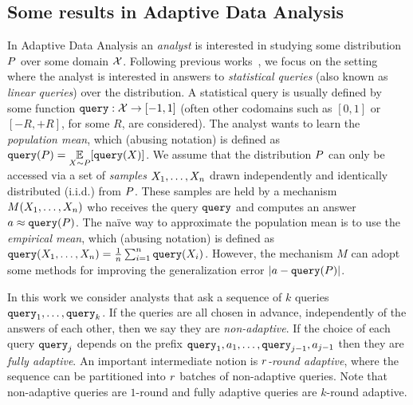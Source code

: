 \subsection{Some results in Adaptive Data Analysis}
In Adaptive Data Analysis an \emph{analyst} is interested in studying some distribution $P$ over some domain $\mathcal{X}$.  Following previous works~\cite{DworkFHPRR15,HardtU14,BassilyNSSSU16}, we focus on the setting where the analyst is interested in answers to \emph{statistical queries} (also known as \emph{linear queries}) over the distribution.  A statistical query is usually defined by some function ${\tt query} : \mathcal{X} \to [-1,1]$ (often other codomains such as $[0,1]$ or $[-R,+R]$, for some $R$, are considered).  The analyst wants to learn the \emph{population mean}, which (abusing notation) is defined as 
$\query(\dist) = \ex{\sample \sim \dist}{\query(\sample)}$. 
%
We assume that the distribution $P$ can only be accessed via a set of \emph{samples} $X_1,\dots,X_n$ drawn independently and identically distributed (i.i.d.) from $P$.  These samples are held by a mechanism $M(X_1,\dots,X_n)$ who receives the query ${\tt query}$ and computes an answer 
$a \approx {\tt query}(P)$.
%
The na\"ive way to approximate the population mean is to use the \emph{empirical mean}, which (abusing notation) is defined as 
${\tt query}(X_1,\dots,X_n) = \frac{1}{n} \sum_{i=1}^{n} {\tt query}(X_i)$.
However, the mechanism $M$ can adopt some methods for improving the generalization error $| a- {\tt query}(P)|$.

In this work we consider analysts that ask a sequence of $k$ queries ${\tt query}_1,\dots,{\tt query}_k$.  If the queries are all chosen in advance, independently of the answers of each other, then we say they are \emph{non-adaptive}.  If the choice of each query ${\tt query}_j$ depends on the prefix ${\tt query}_1,a_1,\dots,{\tt query}_{j-1},a_{j-1}$ then they are \emph{fully adaptive}.  An important intermediate notion is \emph{$r$-round adaptive}, where the sequence can be partitioned into $r$ batches of non-adaptive queries.  Note that non-adaptive queries are $1$-round and fully adaptive queries are $k$-round adaptive.


